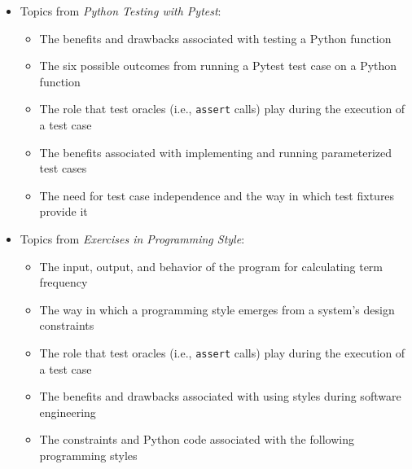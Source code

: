 \documentclass[11pt]{article}
\newcommand{\programmingstyle}{{\em Exercises in Programming Style\/}}
\newcommand{\pytest}{{\em Python Testing with Pytest\/}}
\newcommand{\program}[1]{\lstinline{#1}}
\begin{document}
\begin{itemize}
\begin{itemize}
    \end{itemize}

  \item Topics from \pytest{}:
    \vspace*{-.05in}
    \begin{itemize}

      \itemsep 0.05in

      \item The benefits and drawbacks associated with testing a Python function

      \item The six possible outcomes from running a Pytest test case on a
        Python function

      \item The role that test oracles (i.e., \program{assert} calls) play
        during the execution of a test case

      \item The benefits associated with implementing and running parameterized
        test cases

      \item The need for test case independence and the way in which test
        fixtures provide it

    \end{itemize}

  \item Topics from \programmingstyle{}:
    \vspace*{-.05in}
    \begin{itemize}

      \itemsep 0.05in

      \item The input, output, and behavior of the program for calculating term frequency

      \item The way in which a programming style emerges from a system's design constraints

      \item The role that test oracles (i.e., \program{assert} calls) play
        during the execution of a test case

      \item The benefits and drawbacks associated with using styles during
        software engineering

      \item The constraints and Python code associated with the following
        programming styles


\end{itemize}
\end{itemize}
\end{document}
